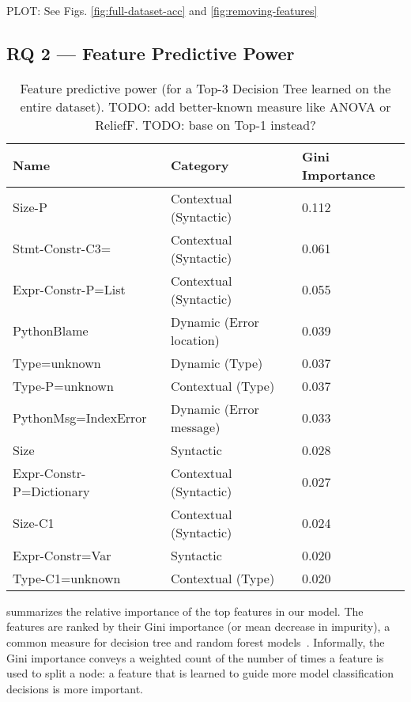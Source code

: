 \documentclass[conference]{IEEEtran}
\begin{document}
PLOT: See Figs. \ref{fig:full-dataset-acc} and \ref{fig:removing-features}

\subsection{RQ 2 --- Feature Predictive Power}

\begin{table}[]
\begin{tabular}{lll}
Name & Category & Gini Importance \\ \bottomrule
Size-P & Contextual (Syntactic)               & 0.112 \\
Stmt-Constr-C3= & Contextual (Syntactic)      & 0.061 \\
Expr-Constr-P=List & Contextual (Syntactic)   & 0.055 \\
PythonBlame & Dynamic (Error location)        & 0.039 \\
Type=unknown & Dynamic (Type)                 & 0.037 \\
Type-P=unknown & Contextual (Type)            & 0.037 \\
PythonMsg=IndexError & Dynamic (Error message)& 0.033 \\
Size & Syntactic                              & 0.028 \\
Expr-Constr-P=Dictionary & Contextual (Syntactic) & 0.027 \\
Size-C1 & Contextual (Syntactic)              & 0.024 \\
Expr-Constr=Var & Syntactic                   & 0.020 \\
Type-C1=unknown & Contextual (Type)           & 0.020 \\
\toprule
\end{tabular}
\caption{Feature predictive power (for a Top-3 Decision Tree 
learned on the entire dataset). 
TODO: add
better-known measure like ANOVA or ReliefF. TODO: base on Top-1 instead?}
\label{tab-feature-predictive-power}
\end{table}

 summarizes the relative importance 
of the top features in our model. The features are ranked by their
Gini importance (or mean decrease in impurity), a common measure
for decision tree and random forest models~\cite{FIXME}. Informally, the
Gini importance conveys a weighted count of the number of times a feature
is used to split a node: a feature that is learned to guide more model
classification decisions is more important. 
\end{document}
